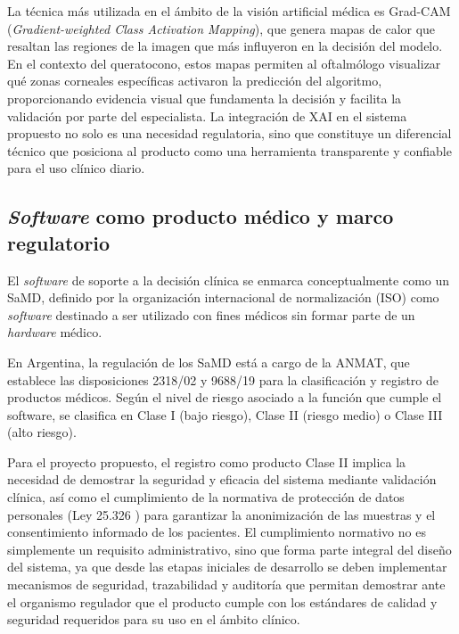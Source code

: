         La técnica más utilizada en el ámbito de la visión artificial médica es Grad-CAM (\textit{Gradient-weighted Class Activation Mapping}), que genera mapas de calor que resaltan las regiones de la imagen que más influyeron en la decisión del modelo. En el contexto del queratocono, estos mapas permiten al oftalmólogo visualizar qué zonas corneales específicas activaron la predicción del algoritmo, proporcionando evidencia visual que fundamenta la decisión y facilita la validación por parte del especialista. La integración de XAI en el sistema propuesto no solo es una necesidad regulatoria, sino que constituye un diferencial técnico que posiciona al producto como una herramienta transparente y confiable para el uso clínico diario.

    \subsection{\textit{Software} como producto médico y marco regulatorio}

        El \textit{software} de soporte a la decisión clínica se enmarca conceptualmente como un SaMD, definido por la organización internacional de normalización (ISO) como \textit{software} destinado a ser utilizado con fines médicos sin formar parte de un \textit{hardware} médico. 
        
        En Argentina, la regulación de los SaMD está a cargo de la ANMAT, que establece las disposiciones 2318/02 y 9688/19  para la clasificación y registro de productos médicos. Según el nivel de riesgo asociado a la función que cumple el software, se clasifica en Clase I (bajo riesgo), Clase II (riesgo medio) o Clase III (alto riesgo).

        Para el proyecto propuesto, el registro como producto Clase II implica la necesidad de demostrar la seguridad y eficacia del sistema mediante validación clínica, así como el cumplimiento de la normativa de protección de datos personales (Ley 25.326 ) para garantizar la anonimización de las muestras y el consentimiento informado de los pacientes. El cumplimiento normativo no es simplemente un requisito administrativo, sino que forma parte integral del diseño del sistema, ya que desde las etapas iniciales de desarrollo se deben implementar mecanismos de seguridad, trazabilidad y auditoría que permitan demostrar ante el organismo regulador que el producto cumple con los estándares de calidad y seguridad requeridos para su uso en el ámbito clínico.

